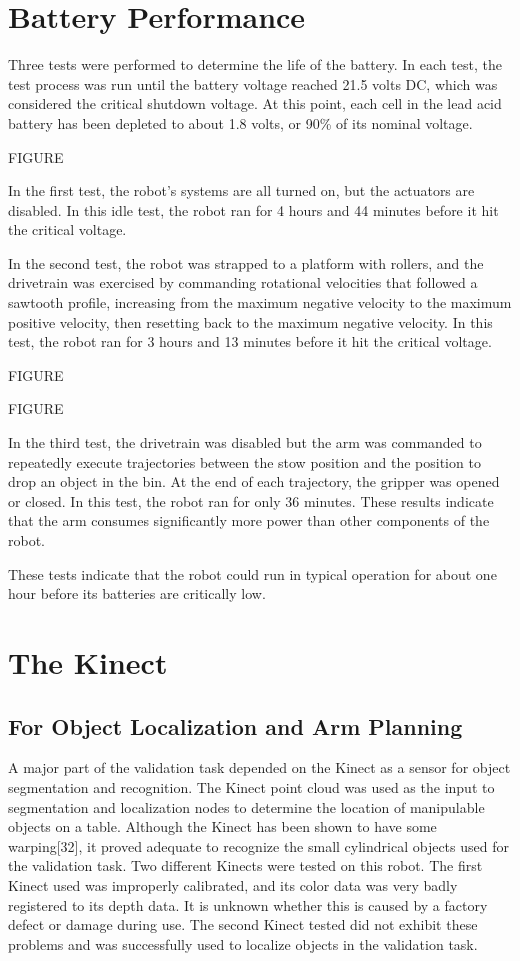 \documentclass[]{cwru} %
\begin{document}
\section{Battery Performance}

Three tests were performed to determine the life of the battery. In each
test, the test process was run until the battery voltage reached 21.5
volts DC, which was considered the critical shutdown voltage. At this
point, each cell in the lead acid battery has been depleted to about 1.8
volts, or 90\% of its nominal voltage.

FIGURE

In the first test, the robot's systems are all turned on, but the
actuators are disabled. In this idle test, the robot ran for 4 hours and
44 minutes before it hit the critical voltage.

In the second test, the robot was strapped to a platform with rollers,
and the drivetrain was exercised by commanding rotational velocities
that followed a sawtooth profile, increasing from the maximum negative
velocity to the maximum positive velocity, then resetting back to the
maximum negative velocity. In this test, the robot ran for 3 hours and
13 minutes before it hit the critical voltage.

FIGURE

FIGURE

In the third test, the drivetrain was disabled but the arm was commanded
to repeatedly execute trajectories between the stow position and the
position to drop an object in the bin. At the end of each trajectory,
the gripper was opened or closed. In this test, the robot ran for only
36 minutes. These results indicate that the arm consumes significantly
more power than other components of the robot.

These tests indicate that the robot could run in typical operation for
about one hour before its batteries are critically low.

\section{The Kinect}

\subsection{For Object Localization and Arm Planning}

A major part of the validation task depended on the Kinect as a sensor
for object segmentation and recognition. The Kinect point cloud was used
as the input to segmentation and localization nodes to determine the
location of manipulable objects on a table. Although the Kinect has been
shown to have some warping{[}32{]}, it proved adequate to recognize the
small cylindrical objects used for the validation task. Two different
Kinects were tested on this robot. The first Kinect used was improperly
calibrated, and its color data was very badly registered to its depth
data. It is unknown whether this is caused by a factory defect or damage
during use. The second Kinect tested did not exhibit these problems and
was successfully used to localize objects in the validation task.
\end{document}
